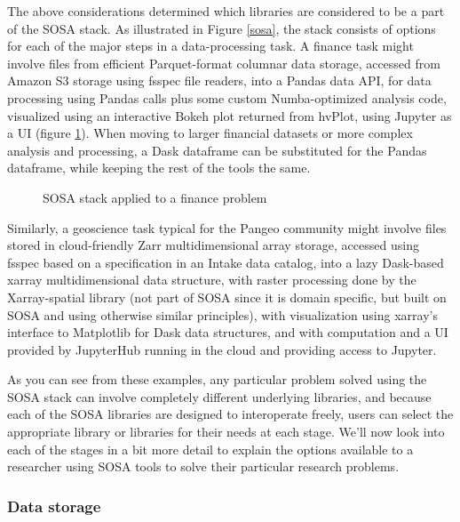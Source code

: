 The above considerations determined which libraries are considered to be a part of the SOSA stack. As illustrated in Figure \ref{sosa}, the stack consists of options for each of the major steps in a data-processing task. A finance task might involve files from efficient Parquet-format columnar data storage, accessed from Amazon S3 storage using fsspec file readers, into a Pandas data API, for data processing using Pandas calls plus some custom Numba-optimized analysis code, visualized using an interactive Bokeh plot returned from hvPlot, using Jupyter as a UI (figure \ref{sosa-finance}). When moving to larger financial datasets or more complex analysis and processing, a Dask dataframe can be substituted for the Pandas dataframe, while keeping the rest of the tools the same.
\begin{figure}[h]
    \noindent{}
    \caption{SOSA stack applied to a finance problem\label{sosa-finance}}
\end{figure}
Similarly, a geoscience task typical for the Pangeo community might involve files stored in cloud-friendly Zarr multidimensional array storage, accessed using fsspec based on a specification in an Intake data catalog, into a lazy Dask-based xarray multidimensional data structure, with raster processing done by the Xarray-spatial library (not part of SOSA since it is domain specific, but built on SOSA and using otherwise similar principles), with visualization using xarray's interface to Matplotlib for Dask data structures, and with computation and a UI provided by JupyterHub running in the cloud and providing access to Jupyter.

As you can see from these examples, any particular problem solved using the SOSA stack can involve completely different underlying libraries, and because each of the SOSA libraries are designed to interoperate freely, users can select the appropriate library or libraries for their needs at each stage. We'll now look into each of the stages in a bit more detail to explain the options available to a researcher using SOSA tools to solve their particular research problems.


\subsubsection{Data storage}


